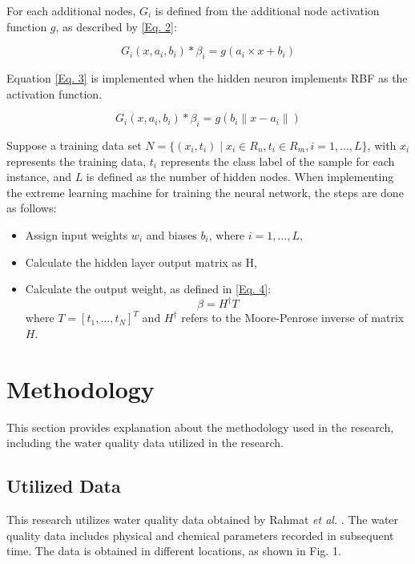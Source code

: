 \documentclass[journal,comsoc]{IEEEtran}
\begin{document}
For each additional nodes, $G_{i}$ is defined from the additional node activation function $g$, as described by \eqref{Eq. 2}:

\begin{equation}
G_{i} (x, a_{i}, b_{i}) * \beta_{i} = g(a_{i} \times x + b_{i})\label{Eq. 2}
\end{equation}

Equation \eqref{Eq. 3} is implemented when the hidden neuron implements RBF as the activation function.

\begin{equation}
G_{i}(x, a_{i}, b_{i}) * \beta_{i} = g(b_{i}\parallel x - a_{i} \parallel)\label{Eq. 3}
\end{equation}

Suppose a training data set $ N = \{(x_{i},t_{i}) \mid x_{i} \in R_{n}, t_{i} \in R_{m}, i = 1, ..., L\}$, with $x_{i}$ represents the training data, $t_{i}$ represents the class label of the sample for each instance, and $L$ is defined as the number of hidden nodes. When implementing the extreme learning machine for training the neural network, the steps are done as follows:

\begin{itemize}
\item Assign input weights $w_{i}$ and biases $b_{i}$, where $i = 1, ..., L$,
\item Calculate the hidden layer output matrix as H,
\item Calculate the output weight, as defined in \eqref{Eq. 4}:
\begin{equation}
\beta = H^\dagger T\label{Eq. 4}
\end{equation}
where $T = [t_{1},...,t_{N}]^T$ and $H^\dagger$ refers to the Moore-Penrose inverse of matrix $H$.
\end{itemize}

\section{Methodology}

This section provides explanation about the methodology used in the research, including the water quality data utilized in the research.

\subsection{Utilized Data}

This research utilizes water quality data obtained by Rahmat {\it et al.} \cite{Rahmat16}. The water quality data includes physical and chemical parameters recorded in subsequent time. The data is obtained in different locations, as shown in Fig. 1.
\end{document}
